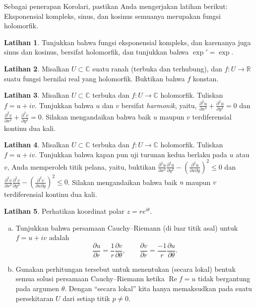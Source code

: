 \documentclass[12pt,openany]{book}
\renewcommand{\Re}{\operatorname{Re}}
\newcommand{\C}{{\mathbb{C}}}
\newcommand{\R}{{\mathbb{R}}}
\newcommand{\myindex}[1]{#1\index{#1}}
\newcommand{\myquote}[1]{``#1''}
\theoremstyle{plain}
\theoremstyle{remark}
\theoremstyle{definition}
\newenvironment{exbox}{%
    \def\FrameCommand{\vrule width 1pt \relax\hspace{10pt}}%
    \MakeFramed{\advance\hsize-\width\FrameRestore}%
}{%
    \endMakeFramed
}
\newenvironment{exparts}{%
    \leavevmode\begin{enumerate}[a),noitemsep,topsep=0pt,parsep=0pt,partopsep=0pt]
}{%
    \end{enumerate}
}
\theoremstyle{exercise}
\newtheorem{exercise}{Latihan}[section]
\theoremstyle{example}
\begin{document}
Sebagai penerapan Korolari,
pastikan Anda mengerjakan latihan berikut: Eksponensial kompleks,
sinus, dan kosinus semuanya merupakan fungsi holomorfik.

\begin{exbox}
\begin{exercise} \label{exercise:exponentialholomorphic}
Tunjukkan bahwa fungsi eksponensial kompleks, dan karenanya juga sinus dan kosinus,
bersifat holomorfik, dan tunjukkan bahwa $\exp' = \exp$.
\end{exercise}

\begin{exercise}
Misalkan $U \subset \C$ suatu ranah (terbuka dan terhubung),
dan $f \colon U \to \R$ suatu fungsi bernilai real yang holomorfik.
Buktikan bahwa $f$ konstan.
\end{exercise}

\begin{exercise}
Misalkan $U \subset \C$ terbuka dan $f \colon U \to \C$ holomorfik.
Tuliskan $f = u+iv$.  Tunjukkan bahwa $u$ dan $v$ bersifat \emph{\myindex{harmonik}},
yaitu,
$\frac{\partial^2 u}{\partial x^2} +  \frac{\partial^2 u}{\partial y^2} = 0$
dan
$\frac{\partial^2 v}{\partial x^2} +  \frac{\partial^2 v}{\partial y^2} = 0$.
Silakan mengandaikan bahwa baik $u$ maupun $v$ terdiferensial kontinu
dua kali.
\end{exercise}

\begin{exercise}
Misalkan $U \subset \C$ terbuka dan $f \colon U \to \C$ holomorfik.
Tuliskan $f = u+iv$.  Tunjukkan bahwa kapan pun uji turunan kedua berlaku
pada $u$ atau $v$, Anda memperoleh titik pelana, yaitu, buktikan
$\frac{\partial^2 u}{\partial x^2} \frac{\partial^2 u}{\partial y^2}
-{\left(\frac{\partial^2 u}{\partial x \partial y}\right)}^2 \leq 0$
dan
$\frac{\partial^2 v}{\partial x^2} \frac{\partial^2 v}{\partial y^2}
-{\left(\frac{\partial^2 v}{\partial x \partial y}\right)}^2 \leq 0$.
Silakan mengandaikan bahwa baik $u$ maupun $v$ terdiferensial kontinu
dua kali.
\end{exercise}

\begin{exercise}
Perhatikan koordinat polar $z = r e^{i\theta}$.
\begin{exparts}
\item
Tunjukkan bahwa
persamaan Cauchy--Riemann (di luar titik asal) untuk $f=u+iv$ adalah
\begin{equation*}
\frac{\partial u}{\partial r} = \frac{1}{r} \frac{\partial v}{\partial \theta},
\qquad
\frac{\partial v}{\partial r} = \frac{-1}{r} \frac{\partial u}{\partial \theta}.
\end{equation*}
\item
Gunakan perhitungan tersebut untuk menentukan (secara lokal) bentuk semua solusi
persamaan Cauchy--Riemann ketika $\Re f = u$ tidak bergantung pada
argumen $\theta$.  Dengan \myquote{secara lokal} kita hanya memaksudkan pada suatu persekitaran $U$ dari
setiap titik $p \neq 0$.
\end{exparts}
\end{exercise}
\end{exbox}
\end{document}
